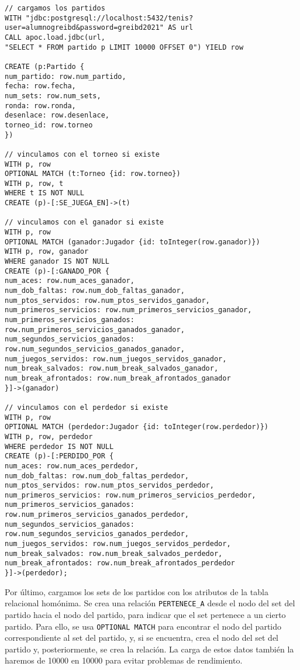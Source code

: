 \begin{verbatim}
// cargamos los partidos
WITH "jdbc:postgresql://localhost:5432/tenis?user=alumnogreibd&password=greibd2021" AS url
CALL apoc.load.jdbc(url,
"SELECT * FROM partido p LIMIT 10000 OFFSET 0") YIELD row

CREATE (p:Partido {
num_partido: row.num_partido,
fecha: row.fecha,
num_sets: row.num_sets,
ronda: row.ronda,
desenlace: row.desenlace,
torneo_id: row.torneo 
})

// vinculamos con el torneo si existe
WITH p, row
OPTIONAL MATCH (t:Torneo {id: row.torneo})
WITH p, row, t
WHERE t IS NOT NULL
CREATE (p)-[:SE_JUEGA_EN]->(t)

// vinculamos con el ganador si existe
WITH p, row
OPTIONAL MATCH (ganador:Jugador {id: toInteger(row.ganador)})
WITH p, row, ganador
WHERE ganador IS NOT NULL
CREATE (p)-[:GANADO_POR {
num_aces: row.num_aces_ganador,
num_dob_faltas: row.num_dob_faltas_ganador,
num_ptos_servidos: row.num_ptos_servidos_ganador,
num_primeros_servicios: row.num_primeros_servicios_ganador,
num_primeros_servicios_ganados: row.num_primeros_servicios_ganados_ganador,
num_segundos_servicios_ganados: row.num_segundos_servicios_ganados_ganador,
num_juegos_servidos: row.num_juegos_servidos_ganador,
num_break_salvados: row.num_break_salvados_ganador,
num_break_afrontados: row.num_break_afrontados_ganador
}]->(ganador)

// vinculamos con el perdedor si existe
WITH p, row
OPTIONAL MATCH (perdedor:Jugador {id: toInteger(row.perdedor)})
WITH p, row, perdedor
WHERE perdedor IS NOT NULL
CREATE (p)-[:PERDIDO_POR {
num_aces: row.num_aces_perdedor,
num_dob_faltas: row.num_dob_faltas_perdedor,
num_ptos_servidos: row.num_ptos_servidos_perdedor,
num_primeros_servicios: row.num_primeros_servicios_perdedor,
num_primeros_servicios_ganados: row.num_primeros_servicios_ganados_perdedor,
num_segundos_servicios_ganados: row.num_segundos_servicios_ganados_perdedor,
num_juegos_servidos: row.num_juegos_servidos_perdedor,
num_break_salvados: row.num_break_salvados_perdedor,
num_break_afrontados: row.num_break_afrontados_perdedor
}]->(perdedor);
\end{verbatim}

Por último, cargamos los sets de los partidos con los atributos de la tabla relacional homónima. Se crea una relación \texttt{PERTENECE\_A} desde el nodo del set del partido hacia el nodo del partido, para indicar que el set pertenece a un cierto partido. Para ello, se usa \texttt{OPTIONAL MATCH} para encontrar el nodo del partido correspondiente al set del partido, y, si se encuentra, crea el nodo del set del partido y, posteriormente, se crea la relación. La carga de estos datos también la haremos de 10000 en 10000 para evitar problemas de rendimiento.


